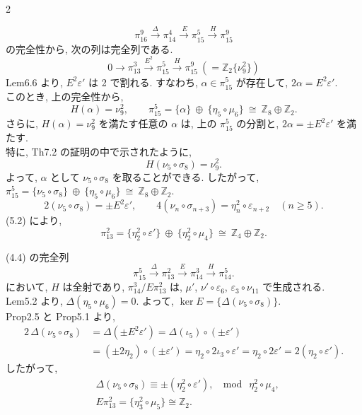 \documentclass[10pt, leqno]{ltjsarticle}
\newcommand{\gen}[1]{\{#1\}}       %
\newcommand{\pit}[2]{\pi_{#1}^{#2}}
\numberwithin{equation}{section}
\theoremstyle{plain}
\theoremstyle{definition}
\theoremstyle{remark}
\begin{document}
\begin{paracol}{2}

\[
  \pit{16}{9}\xrightarrow{\ \Delta\ }\pit{14}{4}\xrightarrow{\ E }\pit{15}{5}
  \xrightarrow{\ H }\pit{15}{9}
\]
の完全性から, 次の列は完全列である. 
\[
0\rightarrow\pit{13}{3}
\xrightarrow{E^2}\pit{15}{5}
\xrightarrow{H}\pit{15}{9}\  ( = \mathbb{Z}_2\gen{\nu_9^2})
\]
Lem6.6 より, \(E^{2}\varepsilon'\) は 2 で割れる. 
すなわち,
\(\alpha\in\pit{15}{5}\) が存在して, 
\(
  2\alpha = E^{2}\varepsilon'.
\)\\
このとき, 上の完全性から, 
\[
  H(\alpha)=\nu_{9}^{2},\qquad
  \pit{15}{5}=\gen{\alpha}\ \oplus\ \gen{\eta_{5}\circ\mu_{6}}
  \ \cong\ \mathbb Z_{8}\oplus\mathbb Z_{2}.
\]
さらに, \(H(\alpha)=\nu_{9}^{2}\) を満たす任意の \(\alpha\) は,
上の \(\pit{15}{5}\) の分割と, 
\(2\alpha=\pm E^{2}\varepsilon'\) を満たす. \\
特に,  Th7.2 の証明の中で示されたように, 
\begin{equation}
H(\nu_5\circ\sigma_8) = \nu_9^2 .
\end{equation}
よって, 
\(\alpha\) として \(\nu_5\circ\sigma_8\) を取ることができる. 
したがって, \\
\(
  \pit{15}{5}
   = \gen{\nu_{5}\circ\sigma_{8}}\ \oplus\ \gen{\eta_{5}\circ\mu_{6}}
   \ \cong\ \mathbb Z_{8}\oplus\mathbb Z_{2}.
\)
\begin{equation}\label{eq:710}
2(\nu_{5}\circ\sigma_{8})=\pm E^{2}\varepsilon',
\qquad
4(\nu_{n}\circ\sigma_{n+3})=\eta_{n}^{2}\circ\varepsilon_{n+2}\quad(n\ge5).
\end{equation}
(5.2) により, 
\[
  \pit{13}{2}
  =\gen{\eta_{2}^{2}\circ \varepsilon'}\ \oplus\ \gen{\eta_{2}^{2}\circ \mu_{4}}
  \ \cong\ \mathbb Z_{4}\oplus\mathbb Z_{2}.
\]



\noindent
(4.4) の完全列
\[
  \pit{15}{5}\xrightarrow{\ \Delta\ }\pit{13}{2}\xrightarrow{\ E\ }\pit{14}{3}
    \xrightarrow{\ H\ }\pit{14}{5}.
\]
において, \(H\) は全射であり, \(\pit{14}{3}/E\pit{13}{2}\) は,
\(\mu'\), \(\nu'\circ \varepsilon_{6}\), 
\(\varepsilon_{3}\circ \nu_{11}\) で生成される. \\
Lem5.2 より, \(\Delta(\eta_{5}\circ\mu_{6})=0\). 
よって, \(\ker E = \gen{\Delta(\nu_5\circ\sigma_8)}\).\\
Prop2.5 と Prop5.1 より,
\[
\begin{align*}
  2\,\Delta(\nu_{5}\circ\sigma_{8})
  & = \Delta(\pm E^{2}\varepsilon')=\Delta(\iota_{5})\circ(\pm \varepsilon')\\
  & = (\pm 2\eta_2) \circ (\pm\varepsilon')
  = \eta_2\circ2\iota_3\circ\varepsilon'
  = \eta_2\circ2\varepsilon'
  = 2(\eta_{2}\circ \varepsilon') .
\end{align*}
\]
したがって,
\begin{align}
& \Delta(\nu_{5}\circ\sigma_{8})\equiv\pm(\eta_{2}^{2}\circ \varepsilon'),\
\mod\ \eta_{2}^{2}\circ\mu_{4}, \\
& E\pit{13}{2}=\gen{\eta_{3}^{2}\circ\mu_{5}}\cong\mathbb Z_{2}. \nonumber
\end{align}


\end{paracol}
\end{document}
